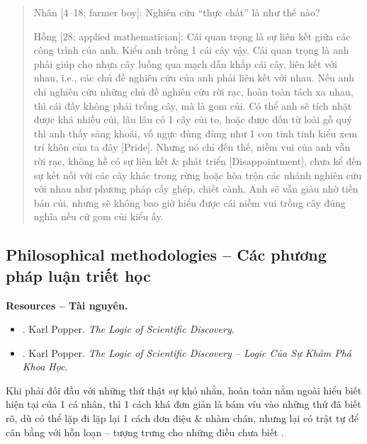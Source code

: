 \documentclass[12pt]{article}
\begin{document}
\begin{quote}
	{\sf Nhân [4--18; farmer boy]}: Nghiên cứu ``thực chất'' là như thế nào?
	
	{\sf Hồng [28; applied mathematician]}: Cái quan trọng là sự liên kết giữa các công trình của anh. Kiểu anh trồng 1 cái cây vậy. Cái quan trọng là anh phải giúp cho nhựa cây luồng qua mạch dẫn khắp cái cây, liên kết với nhau, i.e., các chủ đề nghiên cứu của anh phải liên kết với nhau. Nếu anh chỉ nghiên cứu những chủ đề nghiên cứu rời rạc, hoàn toàn tách xa nhau, thì cái đấy không phải trồng cây, mà là gom củi. Có thể anh sẽ tích nhặt được khá nhiều củi, lâu lâu có 1 cây củi to, hoặc được đốn từ loài gỗ quý thì anh thấy sảng khoái, vỗ ngực đùng đùng như 1 con tinh tinh kiểu xem trí khôn của ta đây [{\sc Pride}]. Nhưng nó chỉ đến thế, niềm vui của anh vẫn rời rạc, không hề có sự liên kết \& phát triển [{\sc Disappointment}], chưa kể đến sự kết nối với các cây khác trong rừng hoặc hòa trộn các nhánh nghiên cứu với nhau như phương pháp cấy ghép, chiết cành. Anh sẽ vẫn giàu nhờ tiền bán củi, nhưng sẽ không bao giờ hiểu được cái niềm vui trồng cây đúng nghĩa nếu cứ gom củi kiểu ấy.
\end{quote}

\subsection{Philosophical methodologies -- Các phương pháp luận triết học}
\textbf{\textsf{Resources -- Tài nguyên.}}
\begin{itemize}
	\item \cite{Popper_logic_science}. {\sc Karl Popper}. {\it The Logic of Scientific Discovery}.
	\item \cite{Popper_logic_khoa_hoc}. {\sc Karl Popper}. {\it The Logic of Scientific Discovery -- Logic Của Sự Khám Phá Khoa Học}.
\end{itemize}
Khi phải đối đầu với những thứ thật sự khó nhằn, hoàn toàn nằm ngoài hiểu biết hiện tại của 1 cá nhân, thì 1 cách khá đơn giản là bám víu vào những thứ đã biết rõ, dù có thể lặp đi lặp lại 1 cách đơn điệu \& nhàm chán, nhưng lại có trật tự để cân bằng với hỗn loạn -- tượng trưng cho những điều chưa biết \cite{Peterson2018,Peterson2022a,Peterson2022b}.
\end{document}
